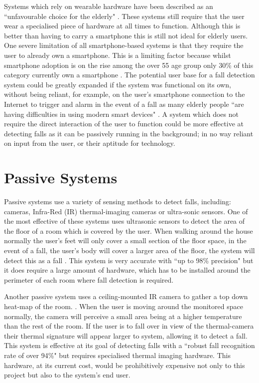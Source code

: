 \documentclass[11pt,a4paper]{report}
\begin{document}
Systems which rely on wearable hardware have been described as an ``unfavourable choice for the elderly" \citep{fallDetectionInvestigation}. These systems still require that the user wear a specialised piece of hardware at all times to function. Although this is better than having to carry a smartphone this is still not ideal for elderly users. One severe limitation of all smartphone-based systems is that they require the user to already own a smartphone. This is a limiting factor because whilst smartphone adoption is on the rise among the over 55 age group only 30\% of this category currently own a smartphone \citep{Berenguer_Are_Smartphones_Ubiquitous}. The potential user base for a fall detection system could be greatly expanded if the system was functional on its own, without being reliant, for example, on the user's smartphone connection to the Internet to trigger and alarm in the event of a fall as many elderly people ``are having difficulties in using modern smart devices" \citep{William_Cognitive_modeling_in_human_computer_interaction}. A system which does not require the direct interaction of the user to function could be more effective at detecting falls as it can be passively running in the background; in no way reliant on input from the user, or their aptitude for technology.

\section{Passive Systems}
Passive systems use a variety of sensing methods to detect falls, including: cameras, Infra-Red (IR) thermal-imaging cameras or ultra-sonic sensors. One of the most effective of these systems uses ultrasonic sensors to detect the area of the floor of a room which is covered by the user. When walking around the house normally the user's feet will only cover a small section of the floor space, in the event of a fall, the user's body will cover a larger area of the floor, the system will detect this as a fall \citep{Chang_Human_fall_detection_based_on_event}. This system is very accurate with ``up to 98\% precision" but it does require a large amount of hardware, which has to be installed around the perimeter of each room where fall detection is required. 

Another passive system uses a ceiling-mounted IR camera to gather a top down heat-map of the room. \citep{Hayashida_The_use_of_thermal_ir_array}. When the user is moving around the monitored space normally, the camera will perceive a small area being at a higher temperature than the rest of the room. If the user is to fall over in view of the thermal-camera their thermal signature will appear larger to system, allowing it to detect a fall. This system is effective at its goal of detecting falls with a ``robust fall recognition rate of over 94\%" but requires specialised thermal imaging hardware. This hardware, at its current cost, would be prohibitively expensive not only to this project but also to the system's end user. 
\end{document}
